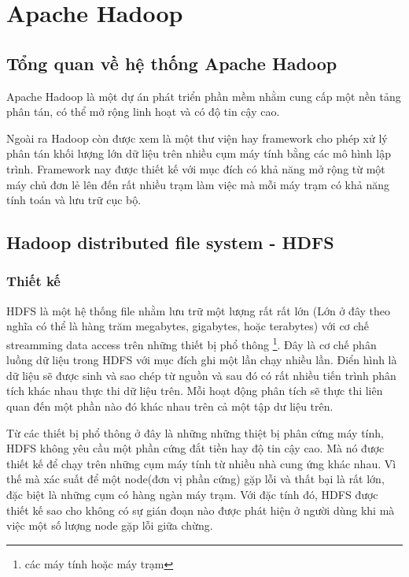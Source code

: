 \chapter{Apache Hadoop}
\section{Tổng quan về hệ thống Apache Hadoop}
Apache Hadoop là một dự án phát triển phần mềm nhằm cung cấp một nền tảng phân tán, có thể mở rộng linh hoạt và có độ tin cậy cao.\par
Ngoài ra Hadoop còn được xem là một thư viện hay framework cho phép xử lý phân tán khối lượng lớn dữ liệu trên nhiều cụm máy tính bằng các mô hình lập trình. Framework nay được thiết kế với mục đích có khả năng mở rộng từ một máy chủ đơn lẻ lên đến rất nhiều trạm làm việc mà mỗi máy trạm có khả năng tính toán và lưu trữ cục bộ.
\section{Hadoop distributed file system - HDFS}
\subsection{Thiết kế}
HDFS là một hệ thống file nhằm lưu trữ một lượng rất rất lớn (Lớn ở đây theo nghĩa có thể là hàng trăm megabytes, gigabytes, hoặc terabytes) với cơ chế streamming data access trên những thiết bị phổ thông \footnote{các máy tính hoặc máy trạm}.
 Đây là cơ chế phân luồng dữ liệu trong HDFS với mục đích ghi một lần chạy nhiều lần. Điển hình là dữ liệu sẽ được sinh và sao chép từ nguồn và sau đó có rất nhiều tiến trình phân tích khác nhau thực thi dữ liệu trên. Mỗi hoạt động phân tích sẽ thực thi liên quan đến một phần nào đó khác nhau trên cả một tập dư liệu trên.\par
 Từ các thiết bị phổ thông ở đây là những những thiệt bị phân cứng máy tính, HDFS không yêu cầu một phần cứng đắt tiền hay độ tin cậy cao. Mà nó được thiết kế để chạy trên những cụm máy tính từ nhiều nhà cung ứng khác nhau. Vì thế mà xác suất để một node(đơn vị phần cứng) gặp lỗi và thất bại là rất lớn, đặc biệt là những cụm có hàng ngàn máy trạm. Với đặc tính đó, HDFS được thiết kế sao cho không có sự gián đoạn nào được phát hiện ở người dùng khi mà việc một số lượng node gặp lỗi giữa chừng.\par
